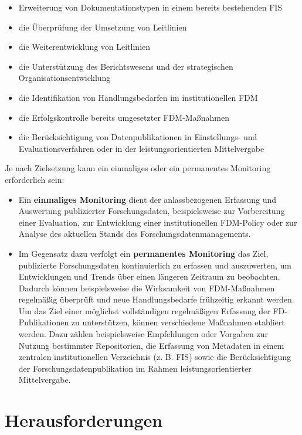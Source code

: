 \documentclass[
  ngerman,
  letterpaper,
  DIV=11]{scrreprt}
\providecommand{\tightlist}{%
  \setlength{\itemsep}{0pt}\setlength{\parskip}{0pt}}
\begin{document}
\begin{itemize}
\tightlist
\item
  Erweiterung von Dokumentationstypen in einem bereits bestehenden FIS
\item
  die Überprüfung der Umsetzung von Leitlinien
\item
  die Weiterentwicklung von Leitlinien
\item
  die Unterstützung des Berichtswesens und der strategischen
  Organisationsentwicklung
\item
  die Identifikation von Handlungsbedarfen im institutionellen FDM
\item
  die Erfolgskontrolle bereits umgesetzter FDM-Maßnahmen
\item
  die Berücksichtigung von Datenpublikationen in Einstellungs- und
  Evaluationsverfahren oder in der leistungsorientierten Mittelvergabe
\end{itemize}

Je nach Zielsetzung kann ein einmaliges oder ein permanentes Monitoring
erforderlich sein:

\begin{itemize}
\tightlist
\item
  Ein \textbf{einmaliges Monitoring} dient der anlassbezogenen Erfassung
  und Auswertung publizierter Forschungsdaten, beispielsweise zur
  Vorbereitung einer Evaluation, zur Entwicklung einer institutionellen
  FDM-Policy oder zur Analyse des aktuellen Stands des
  Forschungsdatenmanagements.
\item
  Im Gegensatz dazu verfolgt ein \textbf{permanentes Monitoring} das
  Ziel, publizierte Forschungsdaten kontinuierlich zu erfassen und
  auszuwerten, um Entwicklungen und Trends über einen längeren Zeitraum
  zu beobachten. Dadurch können beispielsweise die Wirksamkeit von
  FDM-Maßnahmen regelmäßig überprüft und neue Handlungsbedarfe
  frühzeitig erkannt werden. Um das Ziel einer möglichst vollständigen
  regelmäßigen Erfassung der FD-Publikationen zu unterstützen, können
  verschiedene Maßnahmen etabliert werden. Dazu zählen beispielsweise
  Empfehlungen oder Vorgaben zur Nutzung bestimmter Repositorien, die
  Erfassung von Metadaten in einem zentralen institutionellen
  Verzeichnis (z. B. FIS) sowie die Berücksichtigung der
  Forschungsdatenpublikation im Rahmen leistungsorientierter
  Mittelvergabe.
\end{itemize}

\section{Herausforderungen}\label{herausforderungen}
\end{document}
